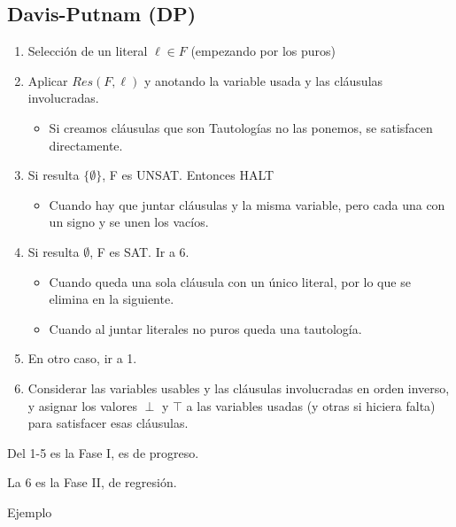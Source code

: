 \documentclass[12pt, twoside, openright]{report} %
\begin{document}
\subsection{Davis-Putnam (DP)}

\begin{enumerate}
	\item Selección de un literal \(\ell \in F\) (empezando por los puros)
	\item Aplicar \(Res(F,\ell)\) y anotando la variable usada y las cláusulas
	      involucradas.

	      \begin{itemize}
		      \item Si creamos cláusulas que son Tautologías no las ponemos, se
		            satisfacen directamente.
	      \end{itemize}
	\item Si resulta $\{ \emptyset \}$, F es UNSAT. Entonces HALT

	      \begin{itemize}
		      \item Cuando hay que juntar cláusulas y la misma variable, pero cada una
		            con un signo y se unen los vacíos.
	      \end{itemize}
	\item Si resulta \(\emptyset\), F es SAT. Ir a 6.

	      \begin{itemize}
		      \item Cuando queda una sola cláusula con un único literal, por lo que se
		            elimina en la siguiente.
		      \item Cuando al juntar literales no puros queda una tautología.
	      \end{itemize}
	\item En otro caso, ir a 1.
	\item Considerar las variables usables y las cláusulas involucradas en
	      orden inverso, y asignar los valores \(\perp\) y \(\top\) a las
	      variables usadas (y otras si hiciera falta) para satisfacer esas
	      cláusulas.
\end{enumerate}

Del 1-5 es la Fase I, es de progreso.

La 6 es la Fase II, de regresión.
\pagebreak

Ejemplo
\end{document}
